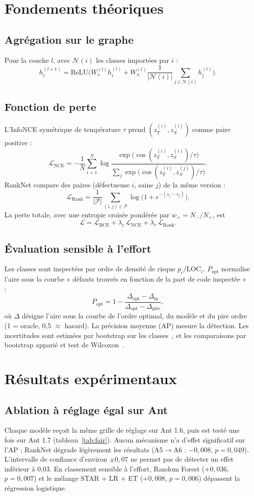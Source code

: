 \documentclass[conference,a4paper]{IEEEtran}
\newcommand{\sect}[1]{\section{\textcolor{ieeeblue}{#1}}}
\newcommand{\subsect}[1]{\subsection{\textcolor{ieeeblue}{#1}}}
\begin{document}
\sect{Fondements théoriques}
\subsect{Agrégation sur le graphe}
Pour la couche $l$, avec $\mathcal{N}(i)$ les classes importées par $i$ :
\begin{equation}
h_i^{(l+1)}=\mathrm{ReLU}\Big(W_s^{(l)}h_i^{(l)}+W_n^{(l)}\frac{1}{|\mathcal{N}(i)|}\sum_{j\in\mathcal{N}(i)}h_j^{(l)}\Big).
\end{equation}

\subsect{Fonction de perte}
L'InfoNCE symétrique de température $\tau$ prend $(z_T^{(i)},z_S^{(i)})$ comme paire positive :
\begin{equation}
\mathcal{L}_{\mathrm{NCE}}=-\frac{1}{N}\sum_{i=1}^{N}\log
\frac{\exp\big(\cos(z_T^{(i)},z_S^{(i)})/\tau\big)}{\sum_{j}\exp\big(\cos(z_T^{(i)},z_S^{(j)})/\tau\big)}.
\end{equation}
RankNet compare des paires (défectueuse $i$, saine $j$) de la même version :
\begin{equation}
\mathcal{L}_{\mathrm{Rank}}=\frac{1}{|\mathcal{P}|}\sum_{(i,j)\in\mathcal{P}}\log\big(1+e^{-(s_i-s_j)}\big).
\end{equation}
La perte totale, avec une entropie croisée pondérée par $w_+=N_-/N_+$, est
\begin{equation}
\mathcal{L}=\mathcal{L}_{\mathrm{BCE}}+\lambda_c\,\mathcal{L}_{\mathrm{NCE}}+\lambda_r\,\mathcal{L}_{\mathrm{Rank}}.
\end{equation}

\subsect{Évaluation sensible à l'effort}
Les classes sont inspectées par ordre de densité de risque $p_i/\mathrm{LOC}_i$. $P_{\mathrm{opt}}$ normalise l'aire sous
la courbe « défauts trouvés en fonction de la part de code inspectée »~\cite{kamei2013} :
\begin{equation}
P_{\mathrm{opt}}=1-\frac{\Delta_{\mathrm{opt}}-\Delta_{\mathrm{m}}}{\Delta_{\mathrm{opt}}-\Delta_{\mathrm{pire}}},
\end{equation}
où $\Delta$ désigne l'aire sous la courbe de l'ordre optimal, du modèle et du pire ordre (1 = oracle, 0,5 $\approx$
hasard). La précision moyenne (AP) mesure la détection. Les incertitudes sont estimées par bootstrap sur les
classes~\cite{efron1993}, et les comparaisons par bootstrap apparié et test de Wilcoxon~\cite{wilcoxon1945}.

\sect{Résultats expérimentaux}
\subsect{Ablation à réglage égal sur Ant}
Chaque modèle reçoit la même grille de réglage sur Ant 1.6, puis est testé une fois sur Ant 1.7
(tableau~\ref{tab:fair}). Aucun mécanisme n'a d'effet significatif sur l'AP ; RankNet dégrade légèrement les
résultats (A5$\to$A6 : $-0{,}008$, $p=0{,}049$). L'intervalle de confiance d'environ $\pm0{,}07$ ne permet pas de
détecter un effet inférieur à 0,03. En classement sensible à l'effort, Random Forest ($+0{,}036$, $p=0{,}007$) et le
mélange STAR + LR + ET ($+0{,}008$, $p=0{,}006$) dépassent la régression logistique.
\end{document}
